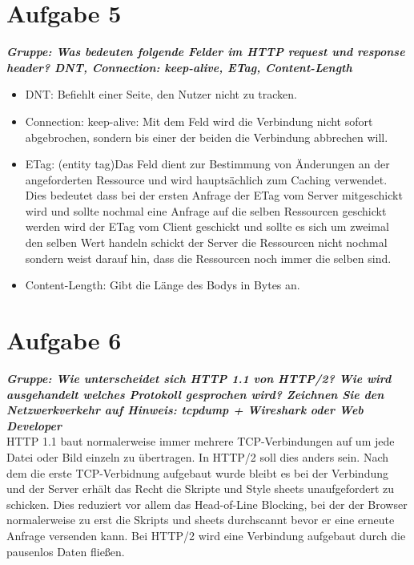 \documentclass[12pt, a4paper]{report}
\begin{document}
\section*{Aufgabe 5}
\textbf{\textit{Gruppe: Was bedeuten folgende Felder im HTTP request und response header? DNT,
Connection: keep-alive, ETag, Content-Length}}
\begin{itemize}
	\item DNT: Befiehlt einer Seite, den Nutzer nicht zu tracken.
	\item Connection: keep-alive: Mit dem Feld wird die Verbindung nicht sofort abgebrochen, sondern bis einer der beiden die Verbindung abbrechen will.
	\item ETag: (entity tag)Das Feld dient zur Bestimmung von Änderungen an der angeforderten Ressource und wird hauptsächlich zum Caching verwendet. Dies bedeutet dass bei der ersten Anfrage der ETag vom Server mitgeschickt wird und sollte nochmal eine Anfrage auf die selben Ressourcen geschickt werden wird der ETag vom Client geschickt und sollte es sich um zweimal den selben Wert handeln schickt der Server die Ressourcen nicht nochmal sondern weist darauf hin, dass die Ressourcen noch immer die selben sind.
	\item Content-Length: Gibt die Länge des Bodys in Bytes an.
\end{itemize}

\section*{Aufgabe 6}
\textbf{\textit{Gruppe: Wie unterscheidet sich HTTP 1.1 von HTTP/2? Wie wird ausgehandelt welches
Protokoll gesprochen wird? Zeichnen Sie den Netzwerkverkehr auf Hinweis: tcpdump +
Wireshark oder Web Developer}}\\
HTTP 1.1 baut normalerweise immer mehrere TCP-Verbindungen auf um jede Datei oder Bild einzeln zu übertragen. In HTTP/2 soll dies anders sein. Nach dem die erste TCP-Verbidnung aufgebaut wurde bleibt es bei der Verbindung und der Server erhält das Recht die Skripte und Style sheets unaufgefordert zu schicken. Dies reduziert vor allem das Head-of-Line Blocking, bei der der Browser normalerweise zu erst die Skripts und sheets durchscannt bevor er eine erneute Anfrage versenden kann. Bei HTTP/2 wird eine Verbindung aufgebaut durch die pausenlos Daten flie\ss en.
\end{document}
